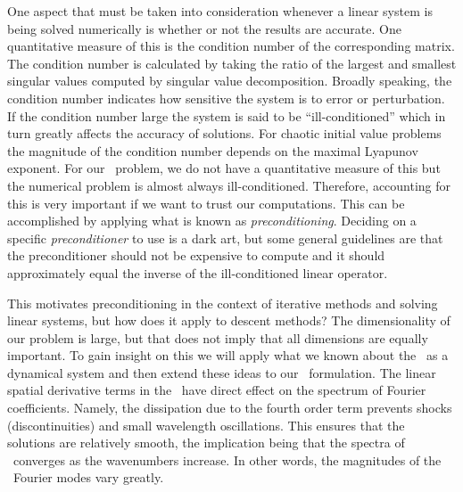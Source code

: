 

One aspect that must be taken into consideration whenever
a linear system is being solved numerically is whether or
not the results are accurate. One quantitative measure
of this is the condition number of the corresponding matrix.
The condition number is calculated by taking the ratio
of the largest and smallest singular values computed
by singular value decomposition. Broadly speaking,
the condition number indicates how sensitive
the system is to error or perturbation. If the condition number
large the system is said to be ``ill-conditioned'' which in
turn greatly affects the accuracy of solutions. For chaotic
initial value problems the magnitude of the condition
number depends on the maximal Lyapunov exponent.
For our \spt\ problem, we do not have a quantitative measure
of this but the numerical problem is almost always ill-conditioned.
Therefore, accounting for this is very important if we want
to trust our computations. This can be accomplished by applying
what is known as \emph{preconditioning}. Deciding on a specific
\emph{preconditioner} to use is a dark art, but some general
guidelines are that the preconditioner should not be expensive
to compute and it should approximately equal the inverse of the
ill-conditioned linear operator.

This motivates preconditioning in the context of iterative methods
and solving linear systems, but how does it apply to descent methods?
The dimensionality of our problem is large, but that does not imply
that all dimensions are equally important. To gain insight on this
we will apply what we known about the \KSe\ as a dynamical system
and then extend these ideas to our \spt\ formulation. The linear
spatial derivative terms in the \KSe\ have direct effect on the spectrum
of Fourier coefficients. Namely, the dissipation due to the fourth
order term prevents shocks (discontinuities)
and small wavelength oscillations. This ensures that the solutions
are relatively smooth, the implication being that the spectra
of \Fcs\ converges as the wavenumbers increase. In other words,
the magnitudes of the \spt\ Fourier modes vary greatly.

